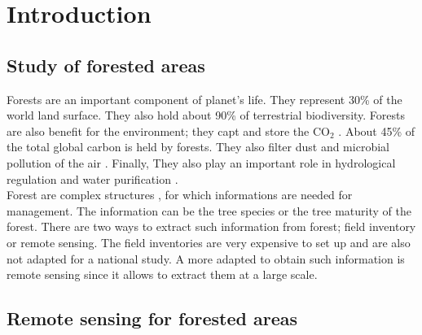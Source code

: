 
\chapter{Introduction} %
\label{Introduction} %


\startcontents[chapters]
\Mprintcontents





\section{Study of forested areas}

Forests are an important component of planet's life. They represent 30\% of the world land surface. They also hold about 90\% of terrestrial biodiversity. Forests are also benefit for the environment; they capt and store the CO$_{2}$ \citep{fahey2010forest}. About 45\% of the total global carbon is held by forests. They also filter dust and microbial pollution of the air \citep{smith2012air}. Finally, They also play an important role in hydrological regulation and water purification \citep{lempriere2008importance}. \\


Forest are complex structures \citep{pommerening2002approaches}, for which informations are needed for management. The information can be the tree species or the tree maturity of the forest. There are two ways to extract such information from forest; field inventory or remote sensing. The field inventories are very expensive to set up and are also not adapted for a national study. A more adapted to obtain such information is remote sensing since it allows to extract them at a large scale. \\

\section{Remote sensing for forested areas}

